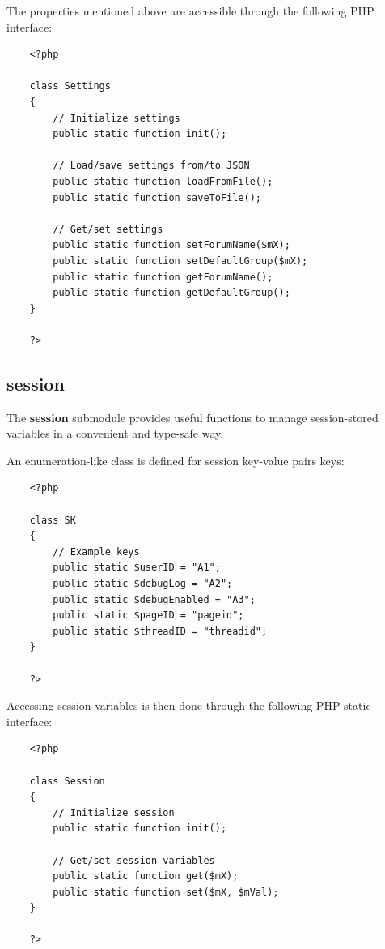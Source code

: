\documentclass[12pt]{report}
\renewcommand\emph{\textbf}
\begin{document}
                    The properties mentioned above are accessible through the following PHP interface:

                    \begin{verbatim}
    <?php

    class Settings
    {
        // Initialize settings
        public static function init();

        // Load/save settings from/to JSON
        public static function loadFromFile();
        public static function saveToFile();

        // Get/set settings
        public static function setForumName($mX);
        public static function setDefaultGroup($mX);
        public static function getForumName();
        public static function getDefaultGroup();
    }

    ?>
                    \end{verbatim}

                \subsection{session}

                    The \emph{session} submodule provides useful functions to manage session-stored variables in a convenient and type-safe way.

                    An enumeration-like class is defined for session key-value pairs keys:

                    \begin{verbatim}
    <?php

    class SK
    {
        // Example keys
        public static $userID = "A1";
        public static $debugLog = "A2";
        public static $debugEnabled = "A3";
        public static $pageID = "pageid";
        public static $threadID = "threadid";
    }

    ?>
                    \end{verbatim}

                    Accessing session variables is then done through the following PHP static interface:


                    \begin{verbatim}
    <?php

    class Session
    {
        // Initialize session
        public static function init();

        // Get/set session variables
        public static function get($mX);
        public static function set($mX, $mVal);
    }

    ?>
                    \end{verbatim}
\end{document}
